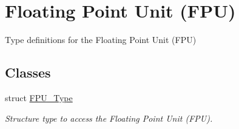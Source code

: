 \hypertarget{group___c_m_s_i_s___f_p_u}{}\section{Floating Point Unit (F\+PU)}
\label{group___c_m_s_i_s___f_p_u}


Type definitions for the Floating Point Unit (F\+PU)  


\subsection*{Classes}
\begin{DoxyCompactItemize}
\item 
struct \mbox{\hyperlink{struct_f_p_u___type}{F\+P\+U\+\_\+\+Type}}
\begin{DoxyCompactList}\small\item\em Structure type to access the Floating Point Unit (F\+PU). \end{DoxyCompactList}\end{DoxyCompactItemize}
